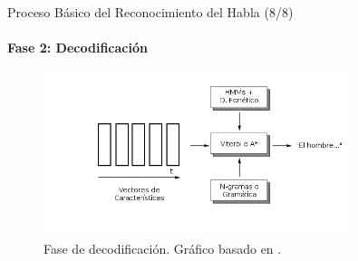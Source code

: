 \begin{frame}{Proceso B\'asico del Reconocimiento del Habla (8/8)}
\framesubtitle{Fase 2: Decodificaci\'on}
\begin{figure}[H] 
\centering
\includegraphics[width=0.8\textwidth]{./graphics/decodificacion.png}
\caption{Fase de decodificaci\'on. Gr\'afico basado en \cite{VerenichASR}.}
\label{figure:decoding}
\end{figure}
\end{frame}
